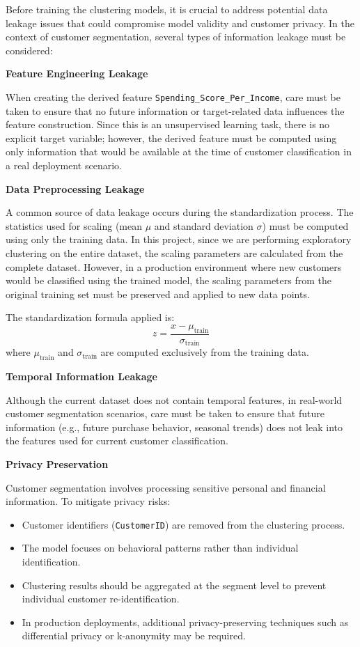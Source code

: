 \documentclass[12pt,a4paper]{article}
\begin{document}
Before training the clustering models, it is crucial to address potential data leakage issues that could compromise model validity and customer privacy. In the context of customer segmentation, several types of information leakage must be considered:

\textbf{Feature Engineering Leakage}

When creating the derived feature \texttt{Spending\_Score\_Per\_Income}, care must be taken to ensure that no future information or target-related data influences the feature construction. Since this is an unsupervised learning task, there is no explicit target variable; however, the derived feature must be computed using only information that would be available at the time of customer classification in a real deployment scenario.

\textbf{Data Preprocessing Leakage}

A common source of data leakage occurs during the standardization process. The statistics used for scaling (mean $\mu$ and standard deviation $\sigma$) must be computed using only the training data. In this project, since we are performing exploratory clustering on the entire dataset, the scaling parameters are calculated from the complete dataset. However, in a production environment where new customers would be classified using the trained model, the scaling parameters from the original training set must be preserved and applied to new data points.

The standardization formula applied is:
\[
z = \frac{x - \mu_{\text{train}}}{\sigma_{\text{train}}}
\]
where $\mu_{\text{train}}$ and $\sigma_{\text{train}}$ are computed exclusively from the training data.

\textbf{Temporal Information Leakage}

Although the current dataset does not contain temporal features, in real-world customer segmentation scenarios, care must be taken to ensure that future information (e.g., future purchase behavior, seasonal trends) does not leak into the features used for current customer classification.

\textbf{Privacy Preservation}

Customer segmentation involves processing sensitive personal and financial information. To mitigate privacy risks:

\begin{itemize}
    \item Customer identifiers (\texttt{CustomerID}) are removed from the clustering process.
    \item The model focuses on behavioral patterns rather than individual identification.
    \item Clustering results should be aggregated at the segment level to prevent individual customer re-identification.
    \item In production deployments, additional privacy-preserving techniques such as differential privacy or k-anonymity may be required.
\end{itemize}
\end{document}
